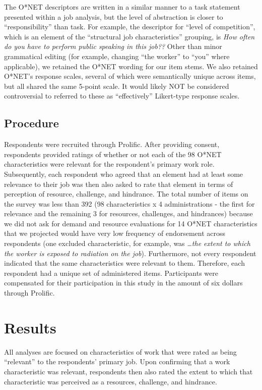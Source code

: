\documentclass[
  man]{apa6}
\begin{document}
The O*NET descriptors are written in a similar manner to a task statement presented within a job analysis, but the level of abstraction is closer to ``responsibility'' than task. For example, the descriptor for ``level of competition'', which is an element of the ``structural job characteristics'' grouping, is \emph{How often do you have to perform public speaking in this job??} Other than minor grammatical editing (for example, changing ``the worker'' to ``you'' where applicable), we retained the O*NET wording for our item stems. We also retained O*NET's response scales, several of which were semantically unique across items, but all shared the same 5-point scale. It would likely NOT be considered controversial to referred to these as ``effectively'' Likert-type response scales.

\hypertarget{procedure}{%
\subsection{Procedure}\label{procedure}}

Respondents were recruited through Prolific. After providing consent, respondents provided ratings of whether or not each of the 98 O*NET characteristics were relevant for the respondent's primary work role. Subsequently, each respondent who agreed that an element had at least some relevance to their job was then also asked to rate that element in terms of perception of resource, challenge, and hindrance. The total number of items on the survey was less than 392 (98 characteristics x 4 administrations - the first for relevance and the remaining 3 for resources, challenges, and hindrances) because we did not ask for demand and resource evaluations for 14 O*NET characteristics that we projected would have very low frequency of endorsement across respondents (one excluded characteristic, for example, was \emph{\ldots the extent to which the worker is exposed to radiation on the job}). Furthermore, not every respondent indicated that the same characteristics were relevant to them. Therefore, each respondent had a unique set of administered items. Participants were compensated for their participation in this study in the amount of six dollars through Prolific.

\hypertarget{results}{%
\section{Results}\label{results}}

All analyses are focused on characteristics of work that were rated as being ``relevant'' to the respondents' primary job. Upon confirming that a work characteristic was relevant, respondents then also rated the extent to which that characteristic was perceived as a resources, challenge, and hindrance.
\end{document}
